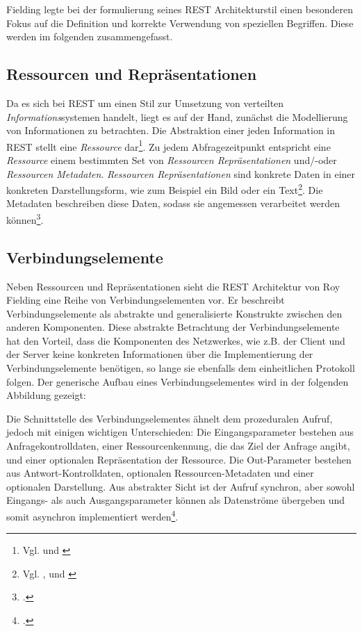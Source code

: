Fielding legte bei der formulierung seines REST Architekturstil einen besonderen Fokus auf die Definition und korrekte Verwendung von speziellen Begriffen. Diese werden im folgenden zusammengefasst.

\subsection{Ressourcen und Repräsentationen}\label{subsection:ressourcen-und-repraesentationen}

Da es sich bei REST um einen Stil zur Umsetzung von verteilten \emph{Informations}systemen handelt, liegt es auf der Hand, zunächst die Modellierung von Informationen zu betrachten. Die Abstraktion einer jeden Information in REST stellt eine \emph{Ressource} dar\footnote{Vgl. \cite[S. 30]{richardson_restful_2013} und \cite[S. 81]{richardson_restful_2007}}. Zu jedem Abfragezeitpunkt entspricht eine \emph{Ressource} einem bestimmten Set von \emph{Ressourcen Repräsentationen} und/-oder \emph{Ressourcen Metadaten}. \emph{Ressourcen Repräsentationen} sind konkrete Daten in einer konkreten Darstellungsform, wie zum Beispiel ein Bild oder ein Text\footnote{Vgl. \cite[Vgl. ][S. 88ff]{fielding_architectural_2000}, \cite[][S. 91]{richardson_restful_2007} und \cite[][S. 30]{richardson_restful_2013}}. Die Metadaten beschreiben diese Daten, sodass sie angemessen verarbeitet werden können\footcite[Vgl. ][S. 87]{fielding_architectural_2000}.

\subsection{Verbindungselemente}\label{subsection:verbindungselemente}

Neben Ressourcen und Repräsentationen sieht die REST Architektur von Roy Fielding eine Reihe von Verbindungselementen vor. Er beschreibt Verbindungselemente als abstrakte und generalisierte Konstrukte zwischen den anderen Komponenten. Diese abstrakte Betrachtung der Verbindungselemente hat den Vorteil, dass die Komponenten des Netzwerkes, wie z.B. der Client und der Server keine konkreten Informationen über die Implementierung der Verbindungselemente benötigen, so lange sie ebenfalls dem einheitlichen Protokoll folgen. Der generische Aufbau eines Verbindungselementes wird in der folgenden Abbildung gezeigt:

Die Schnittstelle des Verbindungselementes ähnelt dem prozeduralen Aufruf, jedoch mit einigen wichtigen Unterschieden: Die Eingangsparameter bestehen aus Anfragekontrolldaten, einer Ressourcenkennung, die das Ziel der Anfrage angibt, und einer optionalen Repräsentation der Ressource. Die Out-Parameter bestehen aus Antwort-Kontrolldaten, optionalen Ressourcen-Metadaten und einer optionalen Darstellung. Aus abstrakter Sicht ist der Aufruf synchron, aber sowohl Eingangs- als auch Ausgangsparameter können als Datenströme übergeben und somit asynchron implementiert werden\footcite[Vgl. ][S. 92ff]{fielding_architectural_2000}.

